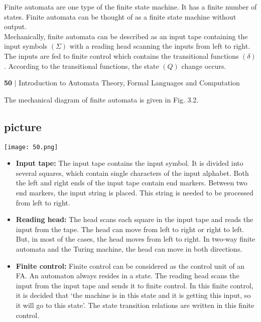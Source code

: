 \documentclass{article}
\begin{document}
\vspace*{0.2cm}
Finite automata are one type of the finite state machine. It has a finite number of states. Finite automata
can be thought of as a finite state machine without output.\\
\hspace*{0.5cm} Mechanically, finite automata can be described as an input tape containing the input symbols $(\Sigma)$ with
a reading head scanning the inputs from left to right. The inputs are fed to finite control which contains
the transitional functions $(\delta)$. According to the transitional functions, the state $(Q)$ change occurs.\\

\newpage
 \begin{flushleft}
    \textbf{50}\hspace*{0.1cm} \textbf{$|$} \hspace*{0.1cm} Introduction to Automata Theory, Formal Languages and Computation
  \end{flushleft}
\vspace*{0.4cm}

The mechanical diagram of finite automata is given in Fig. 3.2.\\

\begin{center}
\section{picture}
\texttt{[image: 50.png]}
\end{center}

\begin{itemize}
  \item \textbf{Input tape:} The input tape contains the input symbol. It is divided into several squares, which contain
single characters of the input alphabet. Both the left and right ends of the input tape contain end
markers. Between two end markers, the input string is placed. This string is needed to be processed
from left to right.\\
\end{itemize}

\begin{itemize}
  \item \textbf{Reading head:} The head scans each square in the input tape and reads the input from the tape.
The head can move from left to right or right to left. But, in most of the cases, the head moves
from left to right. In two-way finite automata and the Turing machine, the head can move in both
directions.\\
  \item \textbf{Finite control:} Finite control can be considered as the control unit of an FA. An automaton always
resides in a state. The reading head scans the input from the input tape and sends it to finite control.
In this finite control, it is decided that ‘the machine is in this state and it is getting this input, so it
will go to this state’. The state transition relations are written in this finite control.\\
\end{itemize}
\end{document}
